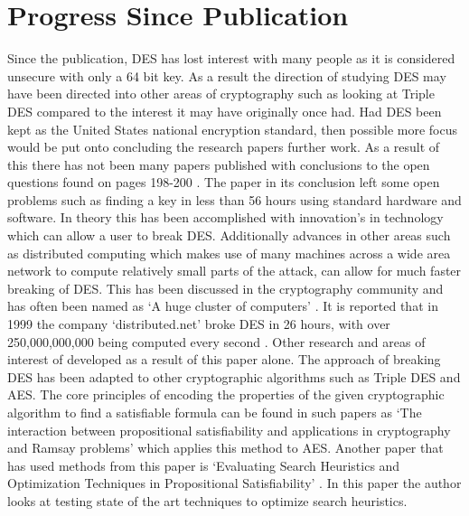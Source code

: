 \documentclass[11pt,a4paper, notitlepage]{report}
\begin{document}
\section{Progress Since Publication}
\label{sec:ProgressSP}
Since the publication, DES has lost interest with many people as it is considered unsecure with only a 64 bit key. As a result the direction of studying DES may have been directed into other areas of cryptography such as looking at Triple DES compared to the interest it may have originally once had. Had DES been kept as the United States national encryption standard, then possible more focus would be put onto concluding the research papers further work. As a result of this there has not been many papers published with conclusions to the open questions found on pages 198-200 \cite{Fabio2000LogicalSAT}.
The paper in its conclusion left some open problems such as finding a key in less than 56 hours using standard hardware and software. In theory this has been accomplished with innovation's in technology which can allow a user to break DES. Additionally advances in other areas such as distributed computing which makes use of many machines across a wide area network to compute relatively small parts of the attack, can allow for much faster breaking of DES. This has been discussed in the cryptography community and has often been named as `A huge cluster of computers' \cite{Junod2013LASEC}. It is reported that in 1999 the company `distributed.net' broke DES in 26 hours, with over 250,000,000,000 being computed every second \cite{Junod2013LASEC}. 
Other research and areas of interest of developed as a result of this paper alone. The approach of breaking DES has been adapted to other cryptographic algorithms such as Triple DES and AES. The core principles of encoding the properties of the given cryptographic algorithm to find a satisfiable formula can be found in such papers as `The interaction between propositional satisfiability and applications in cryptography and Ramsay problems' \cite{Gwynne2010Interaction} which applies this method to AES. Another paper that has used methods from this paper is `Evaluating Search Heuristics and Optimization Techniques in Propositional Satisfiability' \cite{Giunchiglia01evaluatingsearch}. In this paper the author looks at testing state of the art techniques to optimize search heuristics. 
\end{document}
